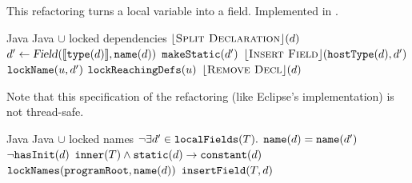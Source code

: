 \subsection{}
This refactoring turns a local variable into a field. Implemented in .

\begin{algorithm}
\caption{$\refactoring{Promote Temp to Field}(d : \type{LocalVarDecl})$}
\label{alg:PromoteTemp}
\begin{algorithmic}[1]
\REQUIRE Java
\ENSURE Java $\cup$ locked dependencies
\medskip
\STATE $\lfloor\textsc{Split Declaration}\rfloor(d)$
\STATE $d' \leftarrow \text{\textsl{Field}}(\llbracket \text{\texttt{type}}(d)\rrbracket, \text{\texttt{name}}(d))$
  \STATE $\text{\texttt{makeStatic}}(d')$
\ENDIF
\STATE $\lfloor\textsc{Insert Field}\rfloor(\text{\texttt{hostType}}(d), d')$
  \STATE $\text{\texttt{lockName}}(u, d')$
  \STATE $\text{\texttt{lockReachingDefs}}(u)$
\ENDFOR
\STATE $\lfloor\textsc{Remove Decl}\rfloor(d)$
\end{algorithmic}
\end{algorithm}

Note that this specification of the refactoring (like Eclipse's implementation) is not thread-safe.

\begin{algorithm}
\caption{$\refactoring{Insert Field}(T : \type{ClassOrInterface}, d : \type{Field})$}
\label{alg:InsertField}
\begin{algorithmic}[1]
\REQUIRE Java
\ENSURE Java $\cup$ locked names
\medskip
\STATE \assert $\neg\exists d'\in\text{\texttt{localFields}}(T).$
\STATE \qquad\qquad\qquad$\text{\texttt{name}}(d)=\text{\texttt{name}}(d')$
\STATE \assert $\neg\text{\texttt{hasInit}}(d)$
\STATE \assert $\text{\texttt{inner}}(T) \wedge \text{\texttt{static}}(d) \rightarrow \text{\texttt{constant}}(d)$
\STATE $\text{\texttt{lockNames}}(\text{\texttt{programRoot}}, \text{\texttt{name}}(d))$
\STATE $\text{\texttt{insertField}}(T, d)$
\end{algorithmic}
\end{algorithm}
